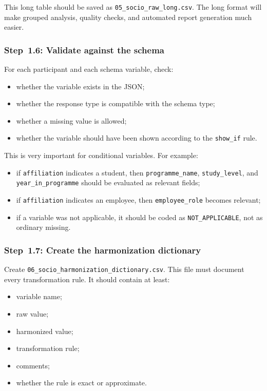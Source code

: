 This long table should be saved as \texttt{05\_socio\_raw\_long.csv}.
The long format will make grouped analysis, quality checks, and automated report generation much easier.

\subsubsection{Step~1.6: Validate against the schema}
For each participant and each schema variable, check:
\begin{itemize}
    \item whether the variable exists in the JSON;
    \item whether the response type is compatible with the schema type;
    \item whether a missing value is allowed;
    \item whether the variable should have been shown according to the \texttt{show\_if} rule.
\end{itemize}

This is very important for conditional variables.
For example:
\begin{itemize}
    \item if \texttt{affiliation} indicates a student, then \texttt{programme\_name},
    \texttt{study\_level}, and \texttt{year\_in\_programme} should be evaluated as relevant fields;
    \item if \texttt{affiliation} indicates an employee, then \texttt{employee\_role}
    becomes relevant;
    \item if a variable was not applicable, it should be coded as \texttt{NOT\_APPLICABLE},
    not as ordinary missing.
\end{itemize}

\subsubsection{Step~1.7: Create the harmonization dictionary}
Create \texttt{06\_socio\_harmonization\_dictionary.csv}.
This file must document every transformation rule.
It should contain at least:
\begin{itemize}
    \item variable name;
    \item raw value;
    \item harmonized value;
    \item transformation rule;
    \item comments;
    \item whether the rule is exact or approximate.
\end{itemize}

